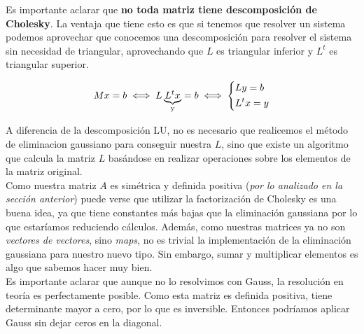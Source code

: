 Es importante aclarar que \textbf{no toda matriz tiene descomposición de Cholesky}.
La ventaja que tiene esto es que si tenemos que resolver un sistema podemos aprovechar que conocemos una descomposición para resolver el sistema sin necesidad de triangular, aprovechando que $L$ es triangular inferior y $L^t$ es triangular superior.

\begin{center}
\[
M x = b \iff L \underbrace{L^t x}_{\text{y}} = b \iff
\begin{dcases}
    L y = b \\
    L^t x = y
\end{dcases}
\]
\end{center}

A diferencia de la descomposición LU, no es necesario que realicemos el método de eliminacion gaussiano para conseguir nuestra $L$, sino que existe un algoritmo que calcula la matriz $L$ basándose en realizar operaciones sobre los elementos de la matriz original. \\

Como nuestra matriz $A$ es simétrica y definida positiva (\textit{por lo analizado en la sección anterior}) puede verse que utilizar la factorización de Cholesky es una buena idea, ya que tiene constantes más bajas que la eliminación gaussiana por lo que estaríamos reduciendo cálculos. Además, como nuestras matrices ya no son \textit{vectores de vectores}, sino \textit{maps},  no es trivial la implementación de la eliminación gaussiana para nuestro nuevo tipo. Sin embargo, sumar y multiplicar elementos es algo que sabemos hacer muy bien. \\

Es importante aclarar que aunque no lo resolvimos con Gauss, la resolución en teoría es perfectamente posible. Como esta matriz es definida positiva, tiene determinante mayor a cero, por lo que es inversible. Entonces podríamos aplicar Gauss sin dejar ceros en la diagonal.
